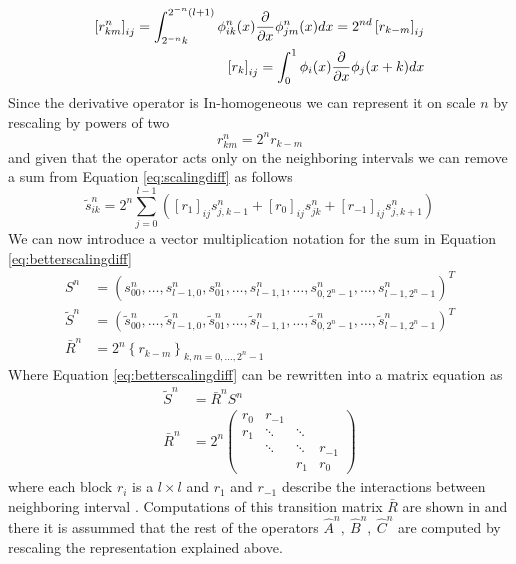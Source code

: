 \documentclass[../master_thesis.tex]{subfiles}
\begin{document}
\begin{align}
\left[r_{k m}^{n}\right]_{i j}=\int_{2^{-n} k}^{2^{-n}(l+1)} \phi_{i k}^{n}(x) \frac{\partial}{\partial x} \phi_{j m}^{n}(x) d x=2^{n d}\left[r_{k-m}\right]_{i j}\\
\left[r_{k}\right]_{i j}=\int_{0}^{1} \phi_{i}(x) \frac{\partial}{\partial x} \phi_{j}(x+k) d x
\end{align}
Since the derivative operator is In-homogeneous we can represent it on scale $n$
by rescaling by powers of two
\begin{equation}
  r_{k m}^{n}=2^{n} r_{k-m}
\end{equation}
and given that the operator acts only on the neighboring intervals we can remove a sum from
Equation \ref{eq:scalingdiff} as follows
\begin{equation}\label{eq:betterscalingdiff}
\tilde{s}_{i k}^{n}=2^{n} \sum_{j=0}^{l-1}\left(\left[r_{1}\right]_{i j} s_{j, k-1}^{n}+\left[r_{0}\right]_{i j} s_{j k}^{n}+\left[r_{-1}\right]_{i j} s_{j, k+1}^{n}\right)
\end{equation}
We can now introduce a vector multiplication notation for the sum in Equation
\ref{eq:betterscalingdiff}
\begin{equation}
\begin{aligned}
  S^{n} &=\left( s_{00}^{n}, \ldots, s_{l-1,0}^{n}, s_{01}^{n},
  \ldots, s_{l-1,1}^{n}, \ldots, s_{0,2^{n}-1}^{n}, \ldots, s_{l-1,2^{n}-1}^{n}
  \right)^{T} \\
  \tilde{S}^{n} &=\left(\tilde{s}_{00}^{n}, \ldots, \tilde{s}_{l-1,0}^{n},
  \tilde{s}_{01}^{n}, \ldots, \tilde{s}_{l-1,1}^{n}, \ldots,
  \tilde{s}_{0,2^{n}-1}^{n}, \ldots, \tilde{s}_{l-1,2^{n}-1}^{n}\right)^{T}\\
  \bar{R}^{n} &=2^{n}\left\{r_{k-m}\right\}_{k, m=0, \ldots, 2^{n}-1}
\end{aligned}
\end{equation}
Where Equation \ref{eq:betterscalingdiff} can be rewritten into a matrix equation
as
\begin{align}
\tilde{S}^{n}&=\bar{R}^{n} S^{n}\\
\bar{R}^{n}&=2^{n}
\begin{pmatrix}
  r_0 & r_{-1} &  &  \\
  r_1 & \ddots & \ddots & \\
   & \ddots & \ddots & r_{-1} \\
   & & r_1 & r_0
\end{pmatrix}
\end{align}
where each block $r_i$ is a $l\times l$ and $r_1$ and  $r_{-1}$ describe the interactions
between neighboring interval \cite{Beylkin1999AdaptiveSO}.
Computations of this transition matrix $\bar{R}$ are shown in \cite{Beylkin1999AdaptiveSO}
and there it is assummed that the rest of the operators $\hat{A}^n,\ \hat{B}^n,\ \hat{C}^n$
are computed by rescaling the representation explained above.
\end{document}
